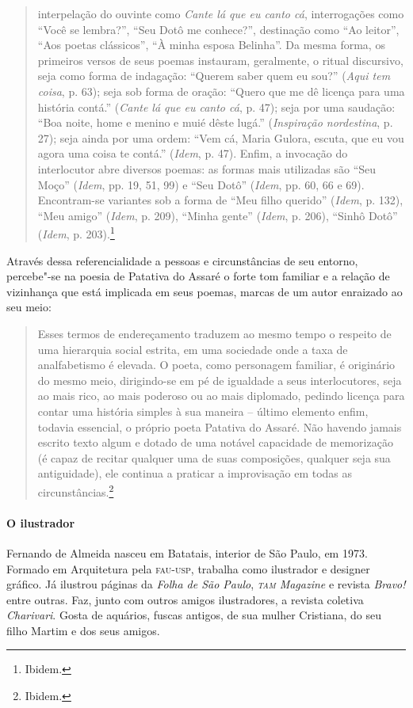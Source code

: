 \documentclass[11pt]{extarticle}
\begin{document}
\begin{quote}
interpelação do ouvinte como
\textit{Cante lá que eu canto cá}, interrogações como “Você se lembra?”, “Seu Dotô me
conhece?”, destinação como “Ao leitor”, “Aos poetas clássicos”, “À minha esposa
Belinha”. Da mesma forma, os primeiros versos de seus poemas instauram,
geralmente, o ritual discursivo, seja como forma de indagação: “Querem saber
quem eu sou?” (\textit{Aqui tem coisa}, p. 63); seja sob forma de oração: “Quero que me dê licença
para uma história contá.” (\textit{Cante lá que eu canto cá}, p. 47); seja por uma saudação: “Boa noite, home
e menino e muié dêste lugá.” (\textit{Inspiração nordestina}, p. 27); seja ainda por uma ordem: “Vem cá,
Maria Gulora, escuta, que eu vou agora uma coisa te contá.” (\textit{Idem}, p. 47). Enfim,
a invocação do interlocutor abre diversos poemas: as formas mais utilizadas são
“Seu Moço” (\textit{Idem}, pp. 19, 51, 99) e “Seu Dotô” (\textit{Idem}, pp. 60, 66 e 69). Encontram-se
variantes sob a forma de “Meu filho querido” (\textit{Idem}, p. 132), “Meu amigo” (\textit{Idem}, p.
209), “Minha gente” (\textit{Idem}, p. 206), “Sinhô Dotô”
(\textit{Idem}, p. 203).\footnote{Ibidem.}
\end{quote}

Através dessa referencialidade a pessoas e circunstâncias de seu entorno, percebe"-se na poesia de Patativa do Assaré o forte tom familiar e a relação de vizinhança que está implicada em seus poemas, marcas de um autor enraizado ao seu meio:

\begin{quote}
Esses termos de
endereçamento traduzem ao mesmo tempo o respeito de uma hierarquia social
estrita, em uma sociedade onde a taxa de analfabetismo é elevada. O poeta, como
personagem familiar, é originário do mesmo meio, dirigindo-se em pé de igualdade
a seus interlocutores, seja ao mais rico, ao mais poderoso ou ao mais diplomado,
pedindo licença para contar uma história simples à sua maneira -- último
elemento enfim, todavia essencial, o próprio poeta Patativa do Assaré. Não
havendo jamais escrito texto algum e dotado de uma notável capacidade de
memorização (é capaz de recitar qualquer uma de suas composições, qualquer seja
sua antiguidade), ele continua a praticar a improvisação em todas as
circunstâncias.\footnote{Ibidem.}
\end{quote}


\paragraph{O ilustrador}
Fernando de Almeida nasceu em Batatais, interior de São Paulo, em 1973. Formado em Arquitetura pela \textsc{fau-usp}, trabalha como ilustrador e designer gráfico.
Já ilustrou páginas da \textit{Folha de São Paulo}, \textit{\textsc{tam} Magazine} e revista \textit{Bravo!} entre outras. Faz, junto com outros amigos ilustradores, a revista coletiva \textit{Charivari}. Gosta de aquários, fuscas antigos, de sua mulher Cristiana, do seu filho Martim e dos seus amigos.
\end{document}
